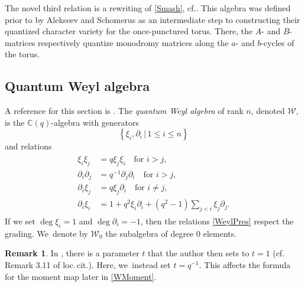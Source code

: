 \documentclass[11pt]{article}
\newcommand{\cf}{cf.\xspace}
\theoremstyle{definition}
\newtheorem{rem}[thm]{Remark}
\newcommand{\CC}{\mathbb{C}}
\newcommand{\WW}{\mathcal{W}}
\newcommand{\del}{\partial}
\begin{document}
The novel third relation is a rewriting of \eqref{Smash}, \cf \cite[A.5]{VarVassRoot}.
This algebra was defined prior to \cite{VarVassRoot} by Alekseev and Schomerus \cite{AlekScho} as an intermediate step to constructing their quantized character variety for the once-punctured torus.
There, the $A$- and $B$-matrices respectively quantize monodromy matrices along the $a$- and $b$-cycles of the torus.

\subsection{Quantum Weyl algebra}\label{QWeyl}
A reference for this section is \cite{GiaZhaQW}.
The \textit{quantum Weyl algebra} of rank $n$, denoted $\WW$, is the $\CC(q)$-algebra with generators
\[
\left\{ \xi_i, \del_i\,|\, 1\le i\le n\right\}
\]
and relations
\begin{align}
\begin{split}
\xi_i\xi_j&= q\xi_j\xi_i\quad\text{for }i>j,\\
\del_i\del_j&=q^{-1}\del_j\del_i\quad\text{for }i>j,\\
\del_i\xi_j&=q\xi_j\del_i\quad\text{for }i\not=j,\\
\del_i\xi_i&=1+q^2\xi_i\del_i+(q^2-1)\sum_{j<i}\xi_j\del_j.
\end{split}\label{WeylPres}
\end{align}
If we set $\deg \xi_i=1$ and $\deg\del_i=-1$, then the relations \eqref{WeylPres} respect the grading. We~denote by $\WW_0$ the subalgebra of degree 0 elements.

\begin{rem}
In \cite{JordanMult}, there is a parameter $t$ that the author then sets to $t=1$ (\cf Remark 3.11 of loc.\,cit.).
Here, we~instead set $t=q^{-1}$.
This affects the formula for the moment map later in \ref{WMoment}.
\end{rem}
\end{document}
